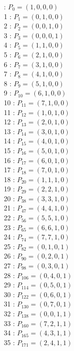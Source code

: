 \documentclass{article}
\begin{document}
{\begin{multicols}{3}
 : $P_{0}=( 1, 0, 0, 0 )$\\
1 : $P_{1}=( 0, 1, 0, 0 )$\\
2 : $P_{2}=( 0, 0, 1, 0 )$\\
3 : $P_{3}=( 0, 0, 0, 1 )$\\
4 : $P_{5}=( 1, 1, 0, 0 )$\\
5 : $P_{6}=( 2, 1, 0, 0 )$\\
6 : $P_{7}=( 3, 1, 0, 0 )$\\
7 : $P_{8}=( 4, 1, 0, 0 )$\\
8 : $P_{9}=( 5, 1, 0, 0 )$\\
9 : $P_{10}=( 6, 1, 0, 0 )$\\
10 : $P_{11}=( 7, 1, 0, 0 )$\\
11 : $P_{12}=( 1, 0, 1, 0 )$\\
12 : $P_{13}=( 2, 0, 1, 0 )$\\
13 : $P_{14}=( 3, 0, 1, 0 )$\\
14 : $P_{15}=( 4, 0, 1, 0 )$\\
15 : $P_{16}=( 5, 0, 1, 0 )$\\
16 : $P_{17}=( 6, 0, 1, 0 )$\\
17 : $P_{18}=( 7, 0, 1, 0 )$\\
18 : $P_{20}=( 1, 1, 1, 0 )$\\
19 : $P_{29}=( 2, 2, 1, 0 )$\\
20 : $P_{38}=( 3, 3, 1, 0 )$\\
21 : $P_{47}=( 4, 4, 1, 0 )$\\
22 : $P_{56}=( 5, 5, 1, 0 )$\\
23 : $P_{65}=( 6, 6, 1, 0 )$\\
24 : $P_{74}=( 7, 7, 1, 0 )$\\
25 : $P_{82}=( 0, 1, 0, 1 )$\\
26 : $P_{90}=( 0, 2, 0, 1 )$\\
27 : $P_{98}=( 0, 3, 0, 1 )$\\
28 : $P_{106}=( 0, 4, 0, 1 )$\\
29 : $P_{114}=( 0, 5, 0, 1 )$\\
30 : $P_{122}=( 0, 6, 0, 1 )$\\
31 : $P_{130}=( 0, 7, 0, 1 )$\\
32 : $P_{138}=( 0, 0, 1, 1 )$\\
33 : $P_{160}=( 7, 2, 1, 1 )$\\
34 : $P_{165}=( 4, 3, 1, 1 )$\\
35 : $P_{171}=( 2, 4, 1, 1 )$\\

\end{multicols}}
\end{document}
